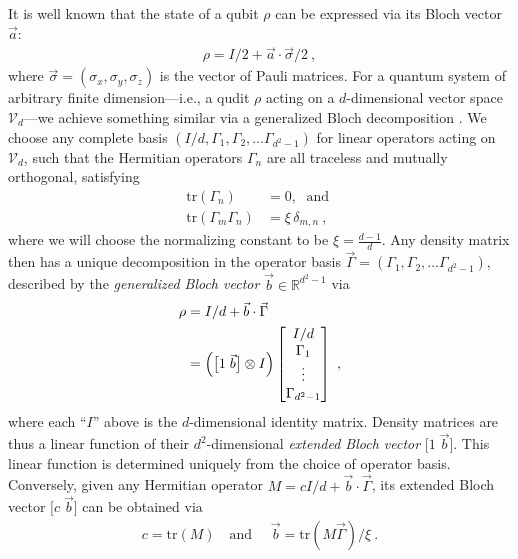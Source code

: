 \documentclass[prx,nofootinbib,onecolumn,showkeys,groupaddress,preprintnumbers,floatfix,
superscriptaddress]{revtex4-1}
\newcommand{\tr}{\text{tr}}
\newcommand{\sysref}{I/d}
\newcommand{\constname}{\xi}
\begin{document}
It is well known that the state of a qubit $\rho$ can be expressed via its Bloch vector $\vec{a}$:
\begin{align}
	\rho = I/2 + \vec{a} \cdot \vec{\sigma} / 2 ~,
	\label{eq:BlochQubit}
\end{align}
where 
$\vec{\sigma} = (\sigma_x, \sigma_y, \sigma_z)$ is the vector of Pauli matrices.	
For a quantum system of arbitrary finite dimension---i.e., a qudit $\rho$ acting on
a $d$-dimensional vector space $\mathcal{V}_d$---we 
achieve something similar via a 
generalized Bloch decomposition
\cite{Jako01, Riec24_Ideal}. 
We choose any complete basis 
$(I/d, \Gamma_1, \Gamma_2, \dots \Gamma_{d^2 - 1})$ for linear operators acting on $\mathcal{V}_d$,
such that the Hermitian operators $\Gamma_n$ are all traceless and mutually orthogonal, satisfying
\begin{subequations}
	\begin{align}
		\tr( \Gamma_n) &= 0 , \; \text{ and } 
		\label{eq:traceless}  \\	
		\tr(\Gamma_m \Gamma_n) &=  \constname \, \delta_{m,n} ~,
		\label{eq:orthonormal}
	\end{align}
\end{subequations}
where we will choose the normalizing constant to be $\constname = \tfrac{d-1}{d}$.
Any density matrix then has a unique decomposition in the 
operator basis 
$\vec{\Gamma} = (\Gamma_1, \Gamma_2, \dots \Gamma_{d^2 - 1})$, 
described by the 
\emph{generalized Bloch vector} $\vec{b} \in \mathbb{R}^{d^2 - 1}$
via 
\begin{align}
	\rho 
	&= \sysref + \vec{b} \cdot \vec{\Gamma} \\
	&= \Bigl( 
	\bigl[ 1 \; \vec{b} \bigr] 
	\otimes I \Bigr) 
	\begin{bmatrix}
	I/d \\
	\Gamma_1 \\
	\vdots \\
	\Gamma_{d^2 - 1}	
	\end{bmatrix}	
	~,
	\label{eq:GenBlochExpansion}
\end{align}
where each ``$I$'' above is the $d$-dimensional identity matrix.
Density matrices are thus %
a linear function of 
their 
$d^2$-dimensional
\emph{extended Bloch vector}
$\bigl[ 1 \; \vec{b} \bigr] $.
This linear function is determined uniquely from the choice of operator basis.
Conversely, given any Hermitian operator $M = cI/d + \vec{b} \cdot \vec{\Gamma}$,
its extended Bloch vector $\bigl[ c \; \vec{b} \bigr]$ 
can be obtained via
\begin{align}
	c = \tr(M) \quad \text{and } \quad \vec{b} = \tr(M \vec{\Gamma}) / \constname ~.
\end{align}	
\end{document}
